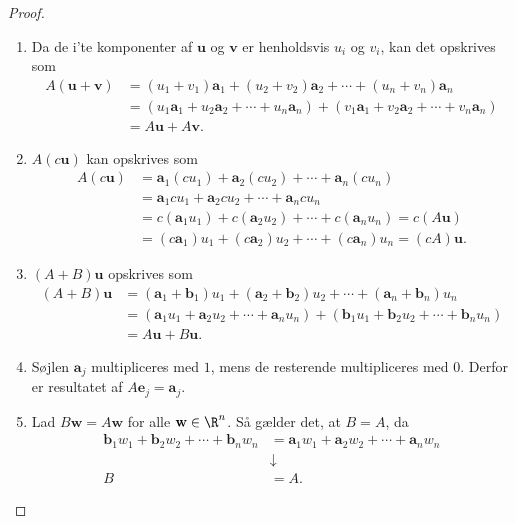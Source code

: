 %
\begin{proof}
\begin{enumerate}[label=(\alph*)]
\item Da de i'te komponenter af $\textbf{u}$ og $\textbf{v}$ er henholdsvis $u_i$ og $v_i$, kan det opskrives som
\begin{align*}
A(\mathbf{u}+\mathbf{v})&=(u_1+v_1)\mathbf{a}_1+(u_2+v_2)\mathbf{a}_2+\cdots + (u_n+v_n)\mathbf{a}_n \\
&=(u_1\mathbf{a}_1+u_2\mathbf{a}_2+\cdots+u_n\mathbf{a}_n)+(v_1\mathbf{a}_1+v_2\mathbf{a}_2+\cdots+v_n\mathbf{a}_n) \\
&=A\mathbf{u}+A\mathbf{v}.
\end{align*}
%
\item $A(c\mathbf{u})$ kan opskrives som
\begin{align*}
A(c \textbf{u})&=\textbf{a}_1(cu_1)+\textbf{a}_2(cu_2) + \cdots + \textbf{a}_n(cu_n) \\
&=\textbf{a}_1cu_1+\textbf{a}_2cu_2 + \cdots + \textbf{a}_ncu_n \\
&=c(\textbf{a}_1u_1)+c(\textbf{a}_2u_2)+\cdots+c(\textbf{a}_n u_n)
=c(A \textbf{u}) \\
&=(c\textbf{a}_1)u_1+(c\textbf{a}_2)u_2+\cdots+(c\textbf{a}_n)u_n=(cA)\textbf{u}.
\end{align*}
%
\item $(A+B)\mathbf{u}$ opskrives som
%
\begin{align*}
(A+B)\textbf{u}&=(\textbf{a}_1+\textbf{b}_1)u_1 +(\textbf{a}_2+\textbf{b}_2)u_2 + \cdots + (\textbf{a}_n+\textbf{b}_n)u_n \\
&=(\textbf{a}_1u_1+\textbf{a}_2u_2+ \cdots + \textbf{a}_nu_n)+(\textbf{b}_1u_1+\textbf{b}_2u_2+ \cdots + \textbf{b}_nu_n) \\
&=A\textbf{u}+B\textbf{u}.
\end{align*}
%
\item Søjlen $\mathbf{a}_j$ multipliceres med $1$, mens de resterende multipliceres med $0$. 
Derfor er resultatet af $A\mathbf{e}_j=\mathbf{a}_j.$
%
\item Lad $B\mathbf{w}=A\mathbf{w}$ for alle $\mathbf{w} \in \R^n$.
Så gælder det, at $B=A$, da
%
\begin{align*}
\textbf{b}_1w_1+\textbf{b}_2 w_2+\cdots+\textbf{b}_n w_n &=\textbf{a}_1 w_1+\textbf{a}_2 w_2+\cdots+\textbf{a}_n w_n \\
&\downarrow\\
B&=A.
\end{align*}

\end{enumerate}
\end{proof}
